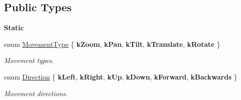 \subsection*{Public Types}
\begin{Indent}\textbf{ Static}\par
\begin{DoxyCompactItemize}
\item 
\mbox{\label{classrev_1_1_camera_controller_aa9e6df05f604325e6844cc37f5ec711c}} 
enum \mbox{\hyperlink{classrev_1_1_camera_controller_aa9e6df05f604325e6844cc37f5ec711c}{Movement\+Type}} \{ \newline
{\bfseries k\+Zoom}, 
{\bfseries k\+Pan}, 
{\bfseries k\+Tilt}, 
{\bfseries k\+Translate}, 
\newline
{\bfseries k\+Rotate}
 \}
\begin{DoxyCompactList}\small\item\em Movement types. \end{DoxyCompactList}\item 
\mbox{\label{classrev_1_1_camera_controller_a73ea4ffe0de90a59a762316ccfdfed7c}} 
enum \mbox{\hyperlink{classrev_1_1_camera_controller_a73ea4ffe0de90a59a762316ccfdfed7c}{Direction}} \{ \newline
{\bfseries k\+Left}, 
{\bfseries k\+Right}, 
{\bfseries k\+Up}, 
{\bfseries k\+Down}, 
\newline
{\bfseries k\+Forward}, 
{\bfseries k\+Backwards}
 \}
\begin{DoxyCompactList}\small\item\em Movement directions. \end{DoxyCompactList}\end{DoxyCompactItemize}
\end{Indent}
